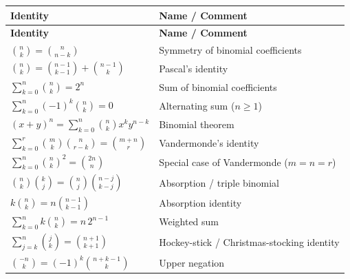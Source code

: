 \documentclass[12pt,a4paper,openany]{book}
\theoremstyle{definition}
\theoremstyle{plain}
\theoremstyle{remark}
\begin{document}
\bigskip

\renewcommand{\arraystretch}{1.6}
\begin{longtable}{p{5cm}p{8cm}}
\hline
\textbf{Identity} & \textbf{Name / Comment} \\
\hline\hline
\endfirsthead
\hline
\textbf{Identity} & \textbf{Name / Comment} \\
\hline\hline
\endhead
\hline
\endfoot

$\displaystyle\binom{n}{k}=\binom{n}{n-k}$
  & Symmetry of binomial coefficients
  \index{binomial coefficient!symmetry}\\

$\displaystyle\binom{n}{k}=\binom{n-1}{k-1}+\binom{n-1}{k}$
  & Pascal's identity
  \index{Pascal's identity}\\

$\displaystyle\sum_{k=0}^{n}\binom{n}{k}=2^n$
  & Sum of binomial coefficients\\

$\displaystyle\sum_{k=0}^{n}(-1)^k\binom{n}{k}=0$
  & Alternating sum ($n\ge 1$)\\

$\displaystyle(x+y)^n=\sum_{k=0}^{n}\binom{n}{k}x^{k}y^{n-k}$
  & Binomial theorem
  \index{binomial theorem}\\

$\displaystyle\sum_{k=0}^{r}\binom{m}{k}\binom{n}{r-k}
  =\binom{m+n}{r}$
  & Vandermonde's identity
  \index{Vandermonde's identity}\\

$\displaystyle\sum_{k=0}^{n}\binom{n}{k}^2=\binom{2n}{n}$
  & Special case of Vandermonde ($m=n=r$)\\

$\displaystyle\binom{n}{k}\binom{k}{j}
  =\binom{n}{j}\binom{n-j}{k-j}$
  & Absorption / triple binomial\\

$\displaystyle k\binom{n}{k}=n\binom{n-1}{k-1}$
  & Absorption identity
  \index{absorption identity}\\

$\displaystyle\sum_{k=0}^{n}k\binom{n}{k}=n\,2^{n-1}$
  & Weighted sum\\

$\displaystyle\sum_{j=k}^{n}\binom{j}{k}=\binom{n+1}{k+1}$
  & Hockey-stick / Christmas-stocking identity
  \index{hockey-stick identity}\\

$\displaystyle\binom{-n}{k}=(-1)^k\binom{n+k-1}{k}$
  & Upper negation\\


\end{longtable}
\end{document}

